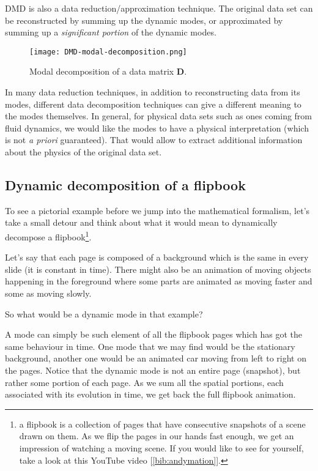 \documentclass[10pt,twocolumn]{article}
\begin{document}
DMD is also a data reduction/approximation technique. The original data set can be reconstructed by summing up the dynamic modes, or approximated by summing up a \textit{significant portion} of the dynamic modes.

\begin{figure}[H]
\centering\texttt{[image: DMD-modal-decomposition.png]}
\caption{Modal decomposition of a data matrix $\mathbf{D}$.}
\label{fig:modal-decomposition}
\end{figure}

In many data reduction techniques, in addition to reconstructing data from its modes, different data decomposition techniques can give a different meaning to the modes themselves. In general, for physical data sets such as ones coming from fluid dynamics, we would like the modes to have a physical interpretation (which is not \textit{a priori} guaranteed). That would allow to extract additional information about the physics of the original data set.


\subsection{Dynamic decomposition of a flipbook}

To see a pictorial example before we jump into the mathematical formalism, let's take a small detour and think about what it would mean to dynamically decompose a flipbook\footnote{a flipbook is a collection of pages that have consecutive snapshots of a scene drawn on them. As we flip the pages in our hands fast enough, we get an impression of watching a moving scene. If you would like to see for yourself, take a look at this YouTube video [\ref{bib:andymation}].}.

Let's say that each page is composed of a background which is the same in every slide (it is constant in time). There might also be an animation of moving objects happening in the foreground where some parts are animated as moving faster and some as moving slowly.

So what would be a dynamic mode in that example?

A mode can simply be such element of all the flipbook pages which has got the same behaviour in time. One mode that we may find would be the stationary background, another one would be an animated car moving from left to right on the pages. Notice that the dynamic mode is not an entire page (snapshot), but rather some portion of each page. As we sum all the spatial portions, each associated with its evolution in time, we get back the full flipbook animation.
\end{document}

